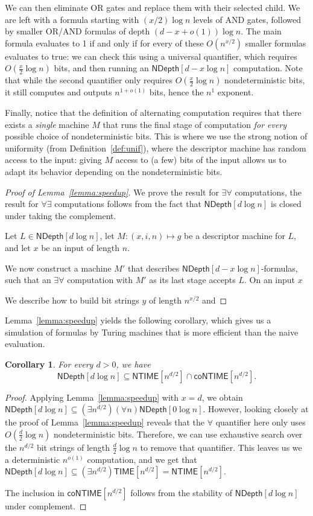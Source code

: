 \documentclass[a4paper, 11pt]{article}
\theoremstyle{plain}
\newtheorem{corollary}[theorem]{Corollary}
\theoremstyle{definition}
\theoremstyle{remark}
\newcommand{\TIME}{\textsf{TIME}}%
\newcommand{\NTIME}{\textsf{NTIME}}%
\newcommand{\coNTIME}{\textsf{coNTIME}}%
\newcommand{\ND}{\textsf{NDepth}}%
\newcommand{\NDL}[1]{\ND\left[ #1 \log n\right]}%
\newcommand{\todoh}[1]{\todo[inline]{TODO: #1 }}%
\begin{document}
We can then eliminate OR gates and replace them with their selected child.
We are left with a formula starting with $(x/2)\log n$ levels of AND gates, 
followed by smaller OR/AND formulas of depth $(d-x + o(1)) \log n$.
The main formula evaluates to 1 if and only if for every of these $O(n^{x/2})$
smaller formulas evaluates to true: 
we can check this using a universal quantifier, 
which requires $O(\frac{x}{2}\log n)$ bits, and then running an $\NDL{d-x}$ computation.
Note that while the second quantifier only requires $O(\frac{x}{2}\log n)$ nondeterministic bits,
it still computes and outputs $n^{1+o(1)}$ bits, hence the $n^1$ exponent. 

Finally, notice that the definition of alternating computation
requires that there exists a \textit{single} machine $M$ that runs the
final stage of computation \textit{for every} possible choice of nondeterministic bits.
This is where we use the strong notion of uniformity (from Definition~\ref{def:unif}), where the descriptor machine
has random access to the input: giving $M$ access to (a few) bits of the input
allows us to adapt its behavior depending on the nondeterministic bits. 

\begin{proof}[Proof of Lemma~\ref{lemma:speedup}]
	We prove the result for $\exists\forall$ computations, 
	the result for $\forall\exists$ computations follows from the fact
	that $\NDL{d}$ is closed under taking the complement.
	
	Let $L\in\NDL{d}$, let $M : (x,i,n) \mapsto g$ be 
	a descriptor machine for $L$, and let $x$ be an input of length $n$.
	
	We now construct a machine $M'$ that describes $\NDL{d-x}$-formulas,
	such that an $\exists\forall$ computation with $M'$ as its last stage accepts $L$.
	On an input $x$

	We describe how to build bit strings $y$ of length $n^{x/2}$ and
	\todoh{finish details of proof}
\end{proof}

Lemma~\ref{lemma:speedup} yields the following corollary,
which gives us a simulation of formulas by Turing machines that is more efficient
than the naive evaluation.
\begin{corollary}\label{cor:speedup}
	For every $d > 0$, we have
	\[\NDL{d} \subseteq \NTIME[n^{d/2}] \cap \coNTIME[n^{d/2}].\]
\end{corollary}
\begin{proof}
	Applying Lemma~\ref{lemma:speedup} with $x = d$, we obtain
	$\NDL{d} \subseteq (\exists n^{d/2}) (\forall n) \NDL{0}$.
	However, looking closely at the proof of Lemma~\ref{lemma:speedup}
	reveals that the $\forall$ quantifier here only uses $O(\frac{d}{2}\log n)$
	nondeterministic bits.
	Therefore, we can use exhaustive search over the $n^{d/2}$ bit strings of length $\frac{d}{2}\log n$
	to remove that quantifier.
	This leaves us we a deterministic $n^{o(1)}$ computation, and we get that
	$\NDL{d} \subseteq (\exists n^{d/2}) \TIME[n^{d/2}] = \NTIME[n^{d/2}]$.

	The inclusion in $\coNTIME[n^{d/2}]$ follows from the stability of $\NDL{d}$
	under complement.
\end{proof}
\end{document}
